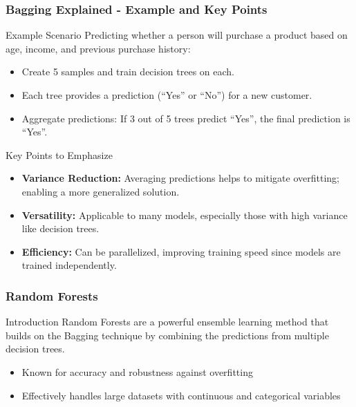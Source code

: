 \documentclass[aspectratio=169]{beamer}
\begin{document}
\begin{frame}[fragile]
    \frametitle{Bagging Explained - Example and Key Points}
    \begin{block}{Example Scenario}
        Predicting whether a person will purchase a product based on age, income, and previous purchase history:
        \begin{itemize}
            \item Create 5 samples and train decision trees on each.
            \item Each tree provides a prediction (“Yes” or “No”) for a new customer.
            \item Aggregate predictions: If 3 out of 5 trees predict “Yes”, the final prediction is “Yes”.
        \end{itemize}
    \end{block}

    \begin{block}{Key Points to Emphasize}
        \begin{itemize}
            \item \textbf{Variance Reduction:} Averaging predictions helps to mitigate overfitting; enabling a more generalized solution.
            \item \textbf{Versatility:} Applicable to many models, especially those with high variance like decision trees.
            \item \textbf{Efficiency:} Can be parallelized, improving training speed since models are trained independently.
        \end{itemize}
    \end{block}
\end{frame}

\begin{frame}[fragile]
    \frametitle{Random Forests}
    
    \begin{block}{Introduction}
        Random Forests are a powerful ensemble learning method that builds on the Bagging technique by combining the predictions from multiple decision trees.
    \end{block}
    
    \begin{itemize}
        \item Known for accuracy and robustness against overfitting
        \item Effectively handles large datasets with continuous and categorical variables
    \end{itemize}

\end{frame}
\end{document}
